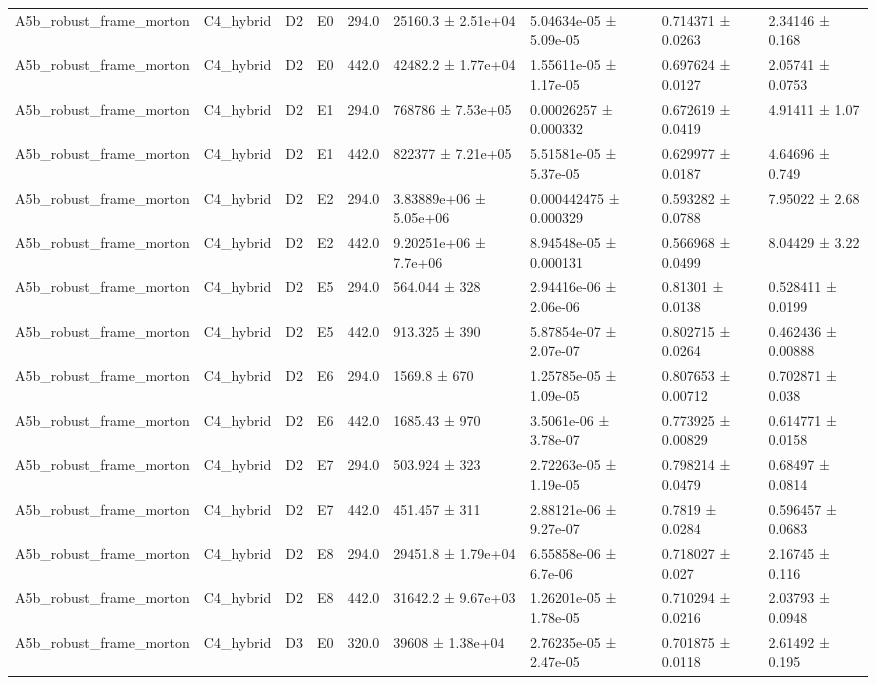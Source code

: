 \begin{table}
\begin{tabular}{lllllllll}
A5b\_robust\_frame\_morton & C4\_hybrid & D2 & E0 & 294.0 & 25160.3 ± 2.51e+04 & 5.04634e-05 ± 5.09e-05 & 0.714371 ± 0.0263 & 2.34146 ± 0.168 \\
A5b\_robust\_frame\_morton & C4\_hybrid & D2 & E0 & 442.0 & 42482.2 ± 1.77e+04 & 1.55611e-05 ± 1.17e-05 & 0.697624 ± 0.0127 & 2.05741 ± 0.0753 \\
A5b\_robust\_frame\_morton & C4\_hybrid & D2 & E1 & 294.0 & 768786 ± 7.53e+05 & 0.00026257 ± 0.000332 & 0.672619 ± 0.0419 & 4.91411 ± 1.07 \\
A5b\_robust\_frame\_morton & C4\_hybrid & D2 & E1 & 442.0 & 822377 ± 7.21e+05 & 5.51581e-05 ± 5.37e-05 & 0.629977 ± 0.0187 & 4.64696 ± 0.749 \\
A5b\_robust\_frame\_morton & C4\_hybrid & D2 & E2 & 294.0 & 3.83889e+06 ± 5.05e+06 & 0.000442475 ± 0.000329 & 0.593282 ± 0.0788 & 7.95022 ± 2.68 \\
A5b\_robust\_frame\_morton & C4\_hybrid & D2 & E2 & 442.0 & 9.20251e+06 ± 7.7e+06 & 8.94548e-05 ± 0.000131 & 0.566968 ± 0.0499 & 8.04429 ± 3.22 \\
A5b\_robust\_frame\_morton & C4\_hybrid & D2 & E5 & 294.0 & 564.044 ± 328 & 2.94416e-06 ± 2.06e-06 & 0.81301 ± 0.0138 & 0.528411 ± 0.0199 \\
A5b\_robust\_frame\_morton & C4\_hybrid & D2 & E5 & 442.0 & 913.325 ± 390 & 5.87854e-07 ± 2.07e-07 & 0.802715 ± 0.0264 & 0.462436 ± 0.00888 \\
A5b\_robust\_frame\_morton & C4\_hybrid & D2 & E6 & 294.0 & 1569.8 ± 670 & 1.25785e-05 ± 1.09e-05 & 0.807653 ± 0.00712 & 0.702871 ± 0.038 \\
A5b\_robust\_frame\_morton & C4\_hybrid & D2 & E6 & 442.0 & 1685.43 ± 970 & 3.5061e-06 ± 3.78e-07 & 0.773925 ± 0.00829 & 0.614771 ± 0.0158 \\
A5b\_robust\_frame\_morton & C4\_hybrid & D2 & E7 & 294.0 & 503.924 ± 323 & 2.72263e-05 ± 1.19e-05 & 0.798214 ± 0.0479 & 0.68497 ± 0.0814 \\
A5b\_robust\_frame\_morton & C4\_hybrid & D2 & E7 & 442.0 & 451.457 ± 311 & 2.88121e-06 ± 9.27e-07 & 0.7819 ± 0.0284 & 0.596457 ± 0.0683 \\
A5b\_robust\_frame\_morton & C4\_hybrid & D2 & E8 & 294.0 & 29451.8 ± 1.79e+04 & 6.55858e-06 ± 6.7e-06 & 0.718027 ± 0.027 & 2.16745 ± 0.116 \\
A5b\_robust\_frame\_morton & C4\_hybrid & D2 & E8 & 442.0 & 31642.2 ± 9.67e+03 & 1.26201e-05 ± 1.78e-05 & 0.710294 ± 0.0216 & 2.03793 ± 0.0948 \\
A5b\_robust\_frame\_morton & C4\_hybrid & D3 & E0 & 320.0 & 39608 ± 1.38e+04 & 2.76235e-05 ± 2.47e-05 & 0.701875 ± 0.0118 & 2.61492 ± 0.195 \\

\end{tabular}
\end{table}
